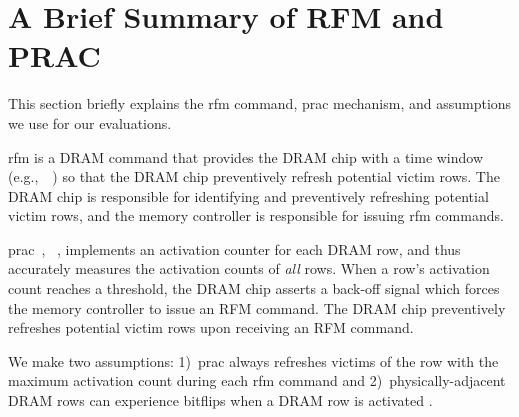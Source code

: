 \section{A Brief Summary of RFM and PRAC}
\label{sec:briefsummary}

This section briefly explains the \gls{rfm} command, \gls{prac} mechanism, and assumptions we use for our evaluations.

\gls{rfm} is a DRAM command that provides the DRAM chip with a time window (e.g.,~~\cite{jedec2024jesd795c}) so that the DRAM chip  preventively refresh potential victim rows.
The DRAM chip is responsible for identifying and preventively refreshing potential victim rows, and the memory controller is responsible for issuing \gls{rfm} commands.

\gls{prac}~\cite{jedec2024jesd795c},  ~\cite{jedec2024jesd795c}, implements an activation counter for each DRAM row, and thus accurately measures the activation counts of \emph{all} rows.
When a row's activation count reaches a threshold, the DRAM chip asserts a back-off signal which forces the memory controller to issue an RFM command.
The DRAM chip preventively refreshes potential victim rows upon receiving an RFM command. 

We make two assumptions:
1)~\gls{prac} always refreshes victims of the row with the maximum activation count during each \gls{rfm} command
and 2)~physically-adjacent DRAM rows can experience bitflips when a DRAM row is activated .

